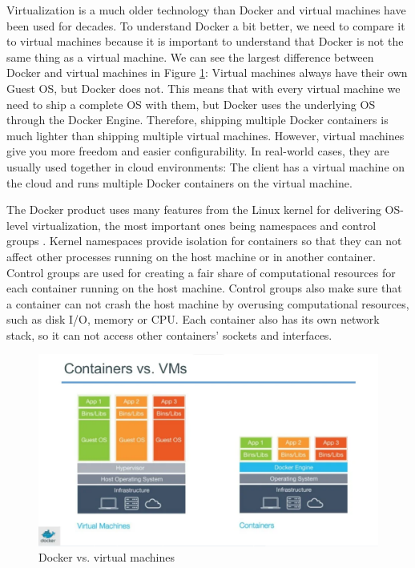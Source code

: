 \documentclass[fleqn,12pt]{olplainarticle}
\begin{document}
Virtualization is a much older technology than Docker and virtual machines have been used for decades. To understand Docker a bit better, we need to compare
it to virtual machines because it is important to understand that Docker is not the same thing as a virtual machine. We can see the largest difference between Docker and virtual machines in Figure \ref{fig:dockervsvm}: Virtual machines always have their own Guest OS, but Docker does not. This means that with every virtual machine we need to ship a complete OS with them, but Docker uses the underlying OS through the Docker Engine. Therefore, shipping multiple Docker containers is much lighter than shipping multiple virtual machines. However, virtual machines give you more freedom and easier configurability. In real-world cases, they are usually used together in cloud environments: The client has a virtual machine on the cloud and runs multiple Docker containers on the virtual machine.

The Docker product uses many features from the Linux kernel for delivering OS-level virtualization, the most important ones being namespaces and control groups \citep{docker:security}. Kernel namespaces provide isolation for containers so that they can not affect other processes running on the host machine or in another container. Control groups are used for creating a fair share of computational resources for each container running on the host machine. Control groups also make sure that a container can not crash the host machine by overusing computational resources, such as disk I/O, memory or CPU. Each container also has its own network stack, so it can not access other containers' sockets and interfaces.

\begin{figure}[h]
    \centering
    \includegraphics[width=1\textwidth]{docker_vs_vm.png}
    \caption{Docker vs. virtual machines \cite{docker:vs_vm}}
    \label{fig:dockervsvm}
\end{figure}
\end{document}
